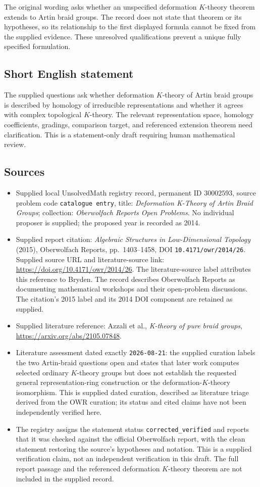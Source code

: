 \documentclass[11pt]{article}
\begin{document}
The original wording asks whether an unspecified deformation \(K\)-theory theorem extends to Artin braid groups. The record does not state that theorem or its hypotheses, so its relationship to the first displayed formula cannot be fixed from the supplied evidence. These unresolved qualifications prevent a unique fully specified formulation.
\subsection{Short English statement}
The supplied questions ask whether deformation \(K\)-theory of Artin braid groups is described by homology of irreducible representations and whether it agrees with complex topological \(K\)-theory. The relevant representation space, homology coefficients, gradings, comparison target, and referenced extension theorem need clarification. This is a statement-only draft requiring human mathematical review.
\subsection{Sources}
\begin{itemize}
\item Supplied local UnsolvedMath registry record, permanent ID \(30002593\), source problem code \texttt{catalogue entry}, title: \emph{Deformation K-Theory of Artin Braid Groups}; collection: \emph{Oberwolfach Reports Open Problems}. No individual proposer is supplied; the proposed year is recorded as 2014.
\item Supplied report citation: \emph{Algebraic Structures in Low-Dimensional Topology} (2015), Oberwolfach Reports, pp.~1403--1458, DOI \texttt{10.4171/owr/2014/26}. Supplied source URL and literature-source link: \url{https://doi.org/10.4171/owr/2014/26}. The literature-source label attributes this reference to Bryden. The record describes Oberwolfach Reports as documenting mathematical workshops and their open-problem discussions. The citation's 2015 label and its 2014 DOI component are retained as supplied.
\item Supplied literature reference: Azzali et al., \emph{K-theory of pure braid groups}, \url{https://arxiv.org/abs/2105.07848}.
\item Literature assessment dated exactly \texttt{2026-08-21}: the supplied curation labels the two Artin-braid questions open and states that later work computes selected ordinary \(K\)-theory groups but does not establish the requested general representation-ring construction or the deformation-\(K\)-theory isomorphism. This is supplied dated curation, described as literature triage derived from the OWR curation; its status and cited claims have not been independently verified here.
\item The registry assigns the statement status \texttt{corrected\_verified} and reports that it was checked against the official Oberwolfach report, with the clean statement restoring the source's hypotheses and notation. This is a supplied verification claim, not an independent verification in this draft. The full report passage and the referenced deformation \(K\)-theory theorem are not included in the supplied record.
\end{itemize}
\end{document}
